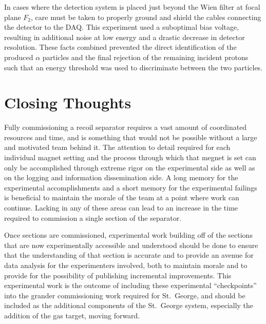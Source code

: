 In cases where the detection system is placed just beyond the Wien
filter at focal plane $F_2$, care must be taken to properly ground and
shield the cables connecting the detector to the DAQ. This experiment
used a suboptimal bias voltage, resulting in additional noise at low
energy and a drastic decrease in detector resolution. These facts
combined prevented the direct identification of the produced $\alpha$
particles and the final rejection of the remaining incident protons such
that an energy threshold was used to discriminate between the two
particles.


\section{Closing Thoughts}
\label{sec:closing-thoughts}

Fully commissioning a recoil separator requires a vast amount of
coordinated resources and time, and is something that would not be
possible without a large and motivated team behind it. The attention to
detail required for each individual magnet setting and the process
through which that megnet is set can only be accomplished through
extreme rigor on the experimental side as well as on the logging and
information dissemination side. A long memory for the experimental
accomplishments and a short memory for the experimental failings is
beneficial to maintain the morale of the team at a point where work can
continue. Lacking in any of these areas can lead to an increase in the
time required to commission a single section of the separator.

Once sections are commissioned, experimental work building off of the
sections that are now experimentally accessible and understood should be
done to ensure that the understanding of that section is accurate and to
provide an avenue for data analysis for the experimenters involved, both
to maintain morale and to provide for the possibility of publishing
incremental improvements. This experimental work is the outcome of
including these experimental ``checkpoints'' into the grander
commissioning work required for St.\ George, and should be included as
the additional components of the St.\ George system, especially the
addition of the gas target, moving forward.

